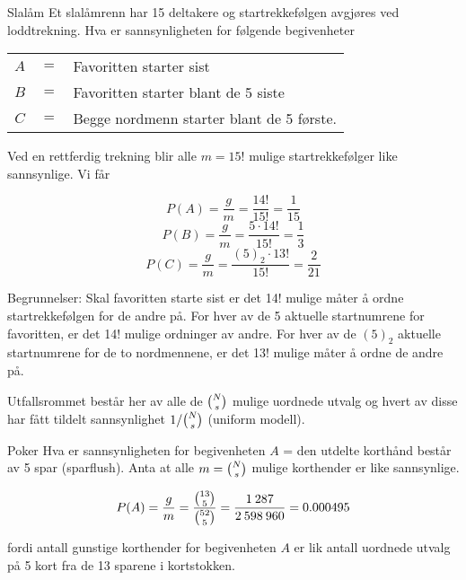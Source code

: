 \begin{eksempel}{Slalåm}
Et slalåmrenn har 15 deltakere og startrekkefølgen avgjøres ved
loddtrek\-ning. Hva er sannsynligheten for følgende begivenheter
\begin{center}
\begin{tabular}{ccl}
    $ A $&$=$& Favoritten starter sist \\
    $ B $&$=$& Favoritten starter blant de 5 siste \\
    $ C $&$=$& Begge nordmenn starter blant de 5 første.
\end{tabular}
\end{center}
Ved en rettferdig trekning blir alle $m=15$! mulige
startrekkefølger like sannsynlige. Vi får 

 \[ P(A)=\frac{g}{m}=\frac{14!}{15!}=\frac{1}{15} \]
 \[ P(B)=\frac{g}{m}=\frac{5 \cdot 14!}{15!}=\frac{1}{3} \]
 \[ P(C)=\frac{g}{m}=\frac{(5)_2 \cdot 13!}{15!}=\frac{2}{21} \]

\noindent Begrunnelser: Skal favoritten starte sist er det 14! mulige måter
å ordne startrekkefølgen for de andre på. For hver av de 5
aktuelle startnumrene for favoritten, er det 14! mulige ordninger
av andre. For hver av de $(5)_2$ aktuelle startnumrene for de to
nordmennene, er det 13! mulige måter å ordne de andre på.
\end{eksempel}

\begin{center}  \end{center}
Utfallsrommet består her av alle de ${{N}\choose{s}}$ mulige uordnede
utvalg og hvert av disse har fått tildelt sannsynlighet
 $1/{{{N}\choose{s}}}$ (uniform modell).\\

\begin{eksempel}{Poker}
Hva er sannsynligheten for begivenheten $A$ = den utdelte korthånd
består av 5 spar (sparflush). Anta at alle $m={{N}\choose{s}}$    mulige
korthender er like sannsynlige.

\[ P(A)=\frac{g}{m}= \frac{{{13}\choose{5}}}{{{52}\choose{5}}}=
                                   \frac{1\: 287}{2\: 598\: 960}=0.000495 \]

\noindent fordi antall gunstige korthender for begivenheten $A$ er lik antall
uordnede utvalg på 5 kort fra de 13 sparene i kortstokken.
\end{eksempel}

